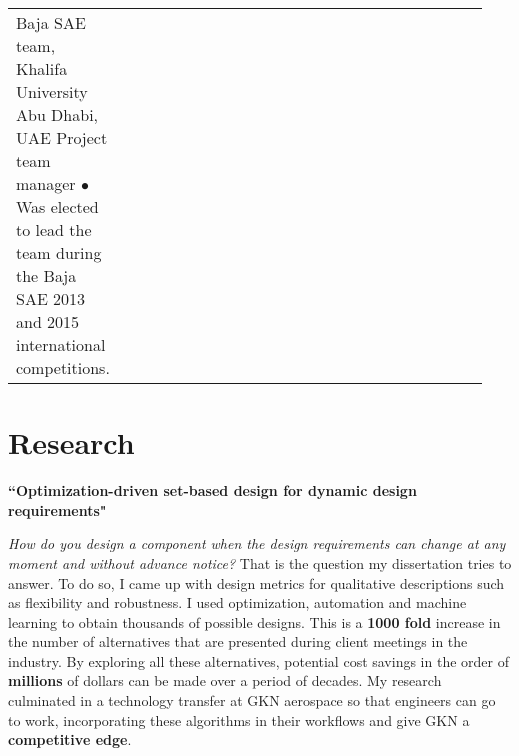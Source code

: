 \documentclass[10pt]{article} %
\begin{document}
\begin{supertabular}{>{\raggedleft\arraybackslash}p{0.17\linewidth}p{0.6\linewidth}>{\raggedleft\arraybackslash}p{0.17\linewidth}}

	{} %
	{Baja SAE team, Khalifa University} %
	{Abu Dhabi, UAE} %
	{Project team manager} %
	{$\bullet$ Was elected to lead the team during the Baja SAE 2013 and 2015 international competitions.}{} %


\end{supertabular}


\vspace{-\baselineskip}\medskip %


\section{Research}

{\raggedright\textbf{``Optimization-driven set-based design for dynamic design requirements"}}
\textit{\center How do you design a component when the design requirements can change at any moment and without advance notice?}
That is the question my dissertation tries to answer. To do so, I came up with design metrics for qualitative descriptions such as flexibility and robustness. I used optimization, automation and machine learning to obtain thousands of possible designs. This is a \textbf{1000 fold} increase in the number of alternatives that are presented during client meetings in the industry. By exploring all these alternatives, potential cost savings in the order of \textbf{millions} of dollars can be made over a period of decades. My research culminated in a technology transfer at GKN aerospace so that engineers can go to work, incorporating these algorithms in their workflows and give GKN a \textbf{competitive edge}.

~~~~~
\end{document}
